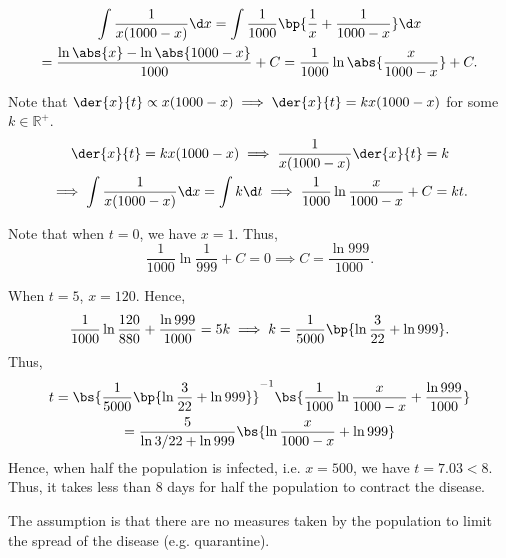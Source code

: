 \begin{solution}
    \begin{ppart}
        \begin{gather*}
            \int \frac1{x(1000-x)} \d x = \int \frac1{1000} \bp{\frac1x + \frac1{1000-x}} \d x\\
            = \frac{\ln \abs{x} - \ln \abs{1000-x}}{1000}+ C = \frac1{1000} \ln \abs{\frac{x}{1000-x}} + C.
        \end{gather*}
    \end{ppart}
    \begin{ppart}
        Note that $\der{x}{t} \propto x(1000-x) \implies \der{x}{t} = kx(1000-x)$ for some $k \in \mathbb{R}^+$.
        \begin{gather*}
            \der{x}{t} = kx(1000-x) \implies \frac1{x(1000-x)} \der{x}{t} = k \\
            \implies \int \frac1{x(1000-x)} \d x = \int k \d t \implies \frac1{1000} \ln{\frac{x}{1000-x}} + C = kt.
        \end{gather*}

        Note that when $t = 0$, we have $x = 1$. Thus, \[\frac1{1000} \ln{\frac{1}{999}} + C = 0 \implies C = \frac{\ln 999}{1000}.\]
        
        When $t = 5$, $x = 120$. Hence, \[\frac1{1000} \ln{\frac{120}{880}} + \frac{\ln 999}{1000} = 5k \implies k = \frac1{5000} \bp{\ln \frac3{22} + \ln 999}.\] Thus, 
        \begin{gather*}
            t = \bs{\frac1{5000} \bp{\ln \frac3{22} + \ln 999}}^{-1} \bs{\frac1{1000} \ln{\frac{x}{1000-x}} + \frac{\ln 999}{1000}} \\
            = \frac{5}{\ln{3/22} + \ln 999} \bs{\ln{\frac{x}{1000-x}} + \ln 999}
        \end{gather*}
        Hence, when half the population is infected, i.e. $x = 500$, we have $t = 7.03 < 8$. Thus, it takes less than 8 days for half the population to contract the disease.
    \end{ppart}
    \begin{ppart}
        The assumption is that there are no measures taken by the population to limit the spread of the disease (e.g. quarantine).
    \end{ppart}
\end{solution}